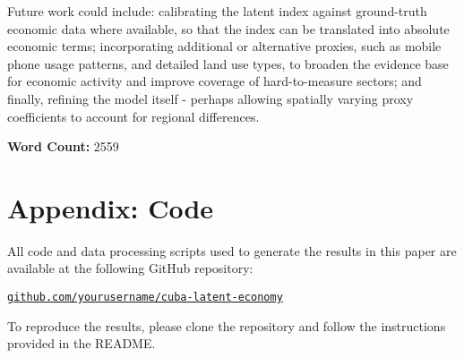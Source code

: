 \documentclass[12pt]{article}
\begin{document}
Future work could include: calibrating the latent index against ground-truth economic data where available, so that the index can be translated into absolute economic terms; incorporating additional or alternative proxies, such as mobile phone usage patterns, and detailed land use types, to broaden the evidence base for economic activity and improve coverage of hard-to-measure sectors; and finally, refining the model itself - perhaps allowing spatially varying proxy coefficients to account for regional differences. 

\noindent \textbf{Word Count:} 2559

\newpage


\printbibliography

\section*{Appendix: Code}
\label{appendix:code}

All code and data processing scripts used to generate the results in this paper are available at the following GitHub repository:

\begin{center}
\href{https://github.com/yourusername/cuba-latent-economy}{\texttt{github.com/yourusername/cuba-latent-economy}}
\end{center}

To reproduce the results, please clone the repository and follow the instructions provided in the README.
\end{document}
